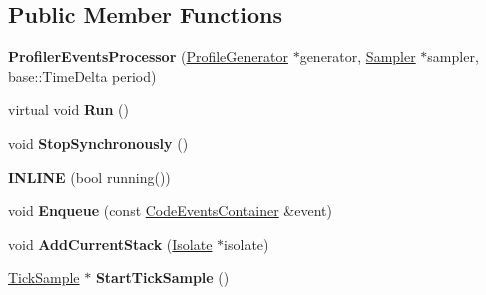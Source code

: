 \subsection*{Public Member Functions}
\begin{DoxyCompactItemize}
\item 
\hypertarget{classv8_1_1internal_1_1_profiler_events_processor_a3632b56f6515a42e5f183f9409e7c97b}{}{\bfseries Profiler\+Events\+Processor} (\hyperlink{classv8_1_1internal_1_1_profile_generator}{Profile\+Generator} $\ast$generator, \hyperlink{classv8_1_1internal_1_1_sampler}{Sampler} $\ast$sampler, base\+::\+Time\+Delta period)\label{classv8_1_1internal_1_1_profiler_events_processor_a3632b56f6515a42e5f183f9409e7c97b}

\item 
\hypertarget{classv8_1_1internal_1_1_profiler_events_processor_af9d1985b1e9c2d300676ac47fc50ecfe}{}virtual void {\bfseries Run} ()\label{classv8_1_1internal_1_1_profiler_events_processor_af9d1985b1e9c2d300676ac47fc50ecfe}

\item 
\hypertarget{classv8_1_1internal_1_1_profiler_events_processor_a2c5ebee64884e9de0ca8edac68c91f5b}{}void {\bfseries Stop\+Synchronously} ()\label{classv8_1_1internal_1_1_profiler_events_processor_a2c5ebee64884e9de0ca8edac68c91f5b}

\item 
\hypertarget{classv8_1_1internal_1_1_profiler_events_processor_a603bac41b4c09abf8f27e53441f947e9}{}{\bfseries I\+N\+L\+I\+N\+E} (bool running())\label{classv8_1_1internal_1_1_profiler_events_processor_a603bac41b4c09abf8f27e53441f947e9}

\item 
\hypertarget{classv8_1_1internal_1_1_profiler_events_processor_a86cc7e6c442f57a7a545805a6cd5fecf}{}void {\bfseries Enqueue} (const \hyperlink{classv8_1_1internal_1_1_code_events_container}{Code\+Events\+Container} \&event)\label{classv8_1_1internal_1_1_profiler_events_processor_a86cc7e6c442f57a7a545805a6cd5fecf}

\item 
\hypertarget{classv8_1_1internal_1_1_profiler_events_processor_ad0afc5c0c0170b12e6111b27acd041d1}{}void {\bfseries Add\+Current\+Stack} (\hyperlink{classv8_1_1internal_1_1_isolate}{Isolate} $\ast$isolate)\label{classv8_1_1internal_1_1_profiler_events_processor_ad0afc5c0c0170b12e6111b27acd041d1}

\item 
\hypertarget{classv8_1_1internal_1_1_profiler_events_processor_a10c94b12e3cabf79f33f1e0bd8281dff}{}\hyperlink{structv8_1_1internal_1_1_tick_sample}{Tick\+Sample} $\ast$ {\bfseries Start\+Tick\+Sample} ()\label{classv8_1_1internal_1_1_profiler_events_processor_a10c94b12e3cabf79f33f1e0bd8281dff}


\end{DoxyCompactItemize}
